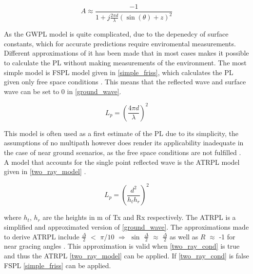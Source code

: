 \begin{equation}
A \approx \frac{-1}{1+j\frac{2\pi d}{\lambda}(\sin(\theta)+z)^{2}}
\label{attenuation_factor_A}
\end{equation}


As the GWPL model is quite complicated, due to the depenedcy of surface constants, which for accurate predictions require enviromental measurements. Different approximations of it has been made that in most cases makes it possible to calculate the PL without making measurements of the environment. The most simple model is FSPL model given in \eqref{simple_friss}, which calculates the PL given only free space conditions \cite{Chong}. This means that the reflected wave and surface wave can be set to 0 in \eqref{ground_wave}. 

\begin{equation}
L_p=\left(\frac{4 \pi d}{\lambda}\right)^2
\label{simple_friss}
\end{equation}

This model is often used as a first estimate of the PL due to its simplicity, the assumptions of no multipath however does render its applicability inadequate in the case of near ground scenarios, as the free space conditions are not fulfilled \cite{two_ray}. \\



A model that accounts for the single point reflected wave is the ATRPL model given in \eqref{two_ray_model} \cite{two_ray, Chong}. 

\begin{equation}
L_{p} = \left(\frac{d^2}{h_t h_r}\right)^2
\label{two_ray_model}
\end{equation}

where $h_t$, $h_r$ are the heights in m of Tx and Rx respectively. 
The ATRPL is a simplified and approximated version of \eqref{ground_wave}. The approximations made to derive ATRPL include $\frac{\Delta}{2}$ $<$ $\pi$/$10$ $\Rightarrow$ $\sin$ $\frac{\Delta}{2}$ $\approx$ $\frac{\Delta}{2}$ as well as $R$ $\approx$ -1 for near gracing angles \cite{Chong}. This approximation is valid when \eqref{two_ray_cond} is true and thus the ATRPL \eqref{two_ray_model} can be applied. If \eqref{two_ray_cond} is false FSPL \eqref{simple_friss} can be applied.
  

